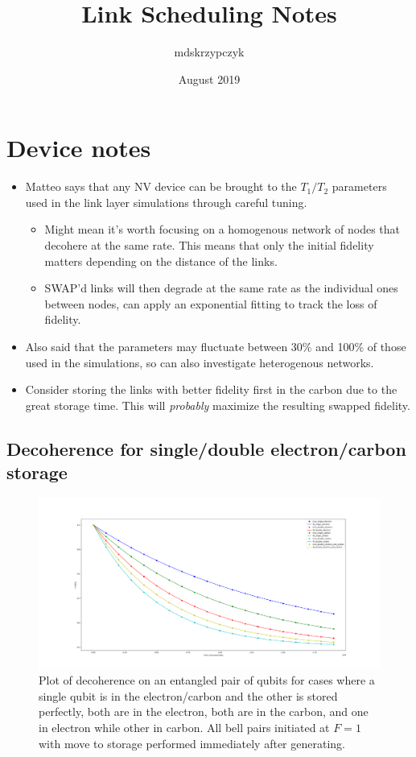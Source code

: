 \documentclass{article}
\title{Link Scheduling Notes}
\author{mdskrzypczyk }
\date{August 2019}
\begin{document}
\maketitle

\section{Device notes}
\begin{itemize}
    \item Matteo says that any NV device can be brought to the $T_1/T_2$ parameters used in the link layer simulations through careful tuning.
    \begin{itemize}
        \item Might mean it's worth focusing on a homogenous network of nodes that decohere at the same rate. This means that only the initial fidelity matters depending on the distance of the links.
        \item SWAP'd links will then degrade at the same rate as the individual ones between nodes, can apply an exponential fitting to track the loss of fidelity.
    \end{itemize}
    \item Also said that the parameters may fluctuate between 30\% and 100\% of those used in the simulations, so can also investigate heterogenous networks.
    \item Consider storing the links with better fidelity first in the carbon due to the great storage time.  This will \emph{probably} maximize the resulting swapped fidelity.
\end{itemize}

\subsection{Decoherence for single/double electron/carbon storage}
\begin{figure}[!htb]
    \centering
    \includegraphics[width=\textwidth]{figures/decoherence.png}
    \caption{Plot of decoherence on an entangled pair of qubits for cases where a single qubit is in the electron/carbon and the other is stored perfectly, both are in the electron, both are in the carbon, and one in electron while other in carbon. All bell pairs initiated at $F=1$ with move to storage performed immediately after generating.}
    \label{fig:decoherence}
\end{figure}
\end{document}
